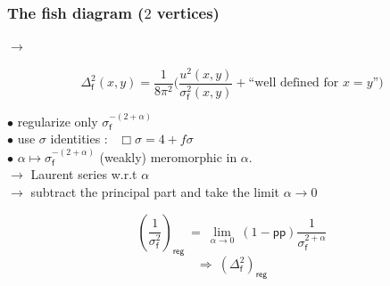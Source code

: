 \documentclass[9pt]{beamer}
\newcommand{\pp}{\mathsf{pp}} %
\newcommand{\fsf}{\mathsf{f}}
\begin{document}
\begin{frame}

\frametitle{The fish diagram ($2$ vertices)}

\begin{minipage}{0.2\linewidth}
\centering
\begin{figure}
\end{figure}
\end{minipage}
\hspace*{-8pt}
$\longrightarrow$
\hspace{5pt}
\begin{minipage}{0.7\linewidth}
\vspace*{-13pt}
\begin{equation*}
\Delta_\fsf^2(x,y) = \frac{1}{8 \pi^2} \bigg( \frac{u^2(x,y)}{\sigma_\fsf^2(x,y)} +  
\mbox{``well defined for $x=y$''}
\bigg)
\end{equation*}
\end{minipage}

\vspace*{20pt}

$\bullet$ regularize only $\sigma_\fsf^{-(2+\alpha)}$ \\

$\bullet$ use $\sigma$ identities : \ $ \Box \sigma = 4 + f \sigma $ \\
 
$\bullet$ $\alpha \mapsto \sigma_\fsf^{-(2+\alpha)}$ (weakly) meromorphic in $\alpha$. \\
\quad $\to$ Laurent series w.r.t $\alpha$ \\
\quad $\to$ subtract the principal part and take the limit $\alpha \to 0$
 
\begin{equation*}
\left(\frac{1}{\sigma_\fsf^2}\right)_\mathsf{reg} \ = \ \lim_{\alpha \to 0} \ \left( 1 - \pp \right) \frac{1}{\sigma_\fsf^{2+\alpha}} 
\end{equation*}
\begin{equation*}
\Longrightarrow \ \left(\Delta_\fsf^{2}\right)_\mathsf{reg} 
\end{equation*}
 
\end{frame}

\end{document}
